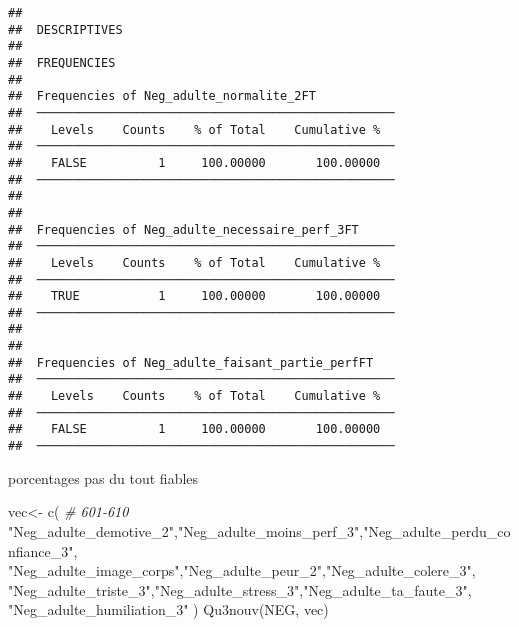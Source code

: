 \documentclass[
]{article}
\newenvironment{Shaded}{\begin{snugshade}}{\end{snugshade}}
\newcommand{\CommentTok}[1]{\textcolor[rgb]{0.56,0.35,0.01}{\textit{#1}}}
\newcommand{\FunctionTok}[1]{\textcolor[rgb]{0.00,0.00,0.00}{#1}}
\newcommand{\NormalTok}[1]{#1}
\newcommand{\OtherTok}[1]{\textcolor[rgb]{0.56,0.35,0.01}{#1}}
\newcommand{\StringTok}[1]{\textcolor[rgb]{0.31,0.60,0.02}{#1}}
\begin{document}
\begin{verbatim}
## 
##  DESCRIPTIVES
## 
##  FREQUENCIES
## 
##  Frequencies of Neg_adulte_normalite_2FT            
##  ────────────────────────────────────────────────── 
##    Levels    Counts    % of Total    Cumulative %   
##  ────────────────────────────────────────────────── 
##    FALSE          1     100.00000       100.00000   
##  ────────────────────────────────────────────────── 
## 
## 
##  Frequencies of Neg_adulte_necessaire_perf_3FT      
##  ────────────────────────────────────────────────── 
##    Levels    Counts    % of Total    Cumulative %   
##  ────────────────────────────────────────────────── 
##    TRUE           1     100.00000       100.00000   
##  ────────────────────────────────────────────────── 
## 
## 
##  Frequencies of Neg_adulte_faisant_partie_perfFT    
##  ────────────────────────────────────────────────── 
##    Levels    Counts    % of Total    Cumulative %   
##  ────────────────────────────────────────────────── 
##    FALSE          1     100.00000       100.00000   
##  ──────────────────────────────────────────────────
\end{verbatim}

porcentages pas du tout fiables

\begin{Shaded}
\begin{Highlighting}[]
\NormalTok{vec}\OtherTok{\textless{}{-}} \FunctionTok{c}\NormalTok{(  }\CommentTok{\#  601{-}610}
  \StringTok{"Neg\_adulte\_demotive\_2"}\NormalTok{,}\StringTok{"Neg\_adulte\_moins\_perf\_3"}\NormalTok{,}\StringTok{"Neg\_adulte\_perdu\_confiance\_3"}\NormalTok{,}
  \StringTok{"Neg\_adulte\_image\_corps"}\NormalTok{,}\StringTok{"Neg\_adulte\_peur\_2"}\NormalTok{,}\StringTok{"Neg\_adulte\_colere\_3"}\NormalTok{,}
  \StringTok{"Neg\_adulte\_triste\_3"}\NormalTok{,}\StringTok{"Neg\_adulte\_stress\_3"}\NormalTok{,}\StringTok{"Neg\_adulte\_ta\_faute\_3"}\NormalTok{,}
  \StringTok{"Neg\_adulte\_humiliation\_3"}
\NormalTok{  )}
\FunctionTok{Qu3nouv}\NormalTok{(NEG, vec)}
\end{Highlighting}
\end{Shaded}
\end{document}

